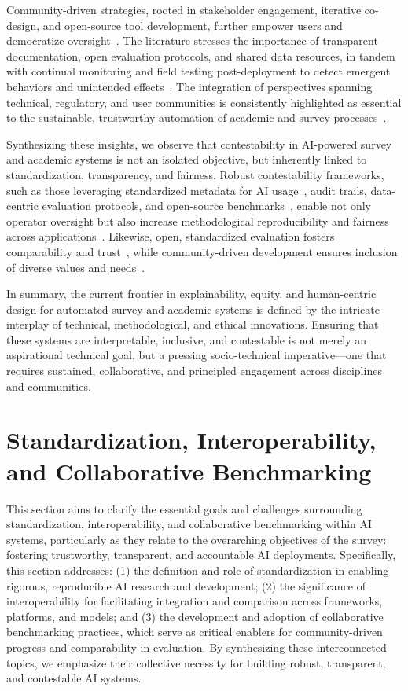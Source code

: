 \documentclass[sigconf]{acmart}
\begin{document}
Community-driven strategies, rooted in stakeholder engagement, iterative co-design, and open-source tool development, further empower users and democratize oversight~\cite{ref64,ref70,ref76,ref80,ref100,ref105,ref106}. The literature stresses the importance of transparent documentation, open evaluation protocols, and shared data resources, in tandem with continual monitoring and field testing post-deployment to detect emergent behaviors and unintended effects~\cite{ref76,ref80,ref85,ref100,ref105}. The integration of perspectives spanning technical, regulatory, and user communities is consistently highlighted as essential to the sustainable, trustworthy automation of academic and survey processes~\cite{ref39,ref76,ref83,ref91,ref93,ref99,ref100,ref106}.

Synthesizing these insights, we observe that contestability in AI-powered survey and academic systems is not an isolated objective, but inherently linked to standardization, transparency, and fairness. Robust contestability frameworks, such as those leveraging standardized metadata for AI usage~\cite{ref106}, audit trails, data-centric evaluation protocols, and open-source benchmarks~\cite{ref80,ref100}, enable not only operator oversight but also increase methodological reproducibility and fairness across applications~\cite{ref39,ref100}. Likewise, open, standardized evaluation fosters comparability and trust~\cite{ref80,ref85}, while community-driven development ensures inclusion of diverse values and needs~\cite{ref64,ref80,ref106}.

In summary, the current frontier in explainability, equity, and human-centric design for automated survey and academic systems is defined by the intricate interplay of technical, methodological, and ethical innovations. Ensuring that these systems are interpretable, inclusive, and contestable is not merely an aspirational technical goal, but a pressing socio-technical imperative—one that requires sustained, collaborative, and principled engagement across disciplines and communities.

\section{Standardization, Interoperability, and Collaborative Benchmarking}

This section aims to clarify the essential goals and challenges surrounding standardization, interoperability, and collaborative benchmarking within AI systems, particularly as they relate to the overarching objectives of the survey: fostering trustworthy, transparent, and accountable AI deployments. Specifically, this section addresses: (1) the definition and role of standardization in enabling rigorous, reproducible AI research and development; (2) the significance of interoperability for facilitating integration and comparison across frameworks, platforms, and models; and (3) the development and adoption of collaborative benchmarking practices, which serve as critical enablers for community-driven progress and comparability in evaluation. By synthesizing these interconnected topics, we emphasize their collective necessity for building robust, transparent, and contestable AI systems.
\end{document}
